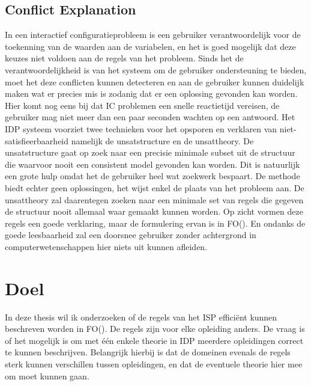 \subsection{Conflict Explanation}
In een interactief configuratieprobleem is een gebruiker verantwoordelijk voor de toekenning van de waarden aan de variabelen, en het is goed mogelijk dat deze keuzes niet voldoen aan de regels van het probleem. Sinds het de verantwoordelijkheid is van het systeem om de gebruiker ondersteuning te bieden, moet het deze conflicten kunnen detecteren en aan de gebruiker kunnen duidelijk maken wat er precies mis is zodanig dat er een oplossing gevonden kan worden. Hier komt nog eens bij dat IC problemen een snelle reactietijd vereisen, de gebruiker mag niet meer dan een paar seconden wachten op een antwoord. Het IDP systeem voorziet twee technieken voor het opsporen en verklaren van niet-satisfieerbaarheid namelijk de unsatstructure en de unsattheory. De unsatstructure gaat op zoek naar een precisie minimale subset uit de structuur die waarvoor nooit een consistent model gevonden kan worden. Dit is natuurlijk een grote hulp omdat het de gebruiker heel wat zoekwerk bespaart. De methode biedt echter geen oplossingen, het wijst enkel de plaats van het probleem aan. De unsattheory zal daarentegen zoeken naar een minimale set van regels die gegeven de structuur nooit allemaal waar gemaakt kunnen worden. Op zicht vormen deze regels een goede verklaring, maar de formulering ervan is in FO(\textperiodcentered). En ondanks de goede leesbaarheid zal een doorsnee gebruiker zonder achtergrond in computerwetenschappen hier niets uit kunnen afleiden.


\section{Doel}
In deze thesis wil ik onderzoeken of de regels van het ISP effici\"{e}nt kunnen beschreven worden in FO(\textperiodcentered). De regels zijn voor elke opleiding anders. De vraag is of het mogelijk is om met \'{e}\'{e}n enkele theorie in IDP meerdere opleidingen correct te kunnen beschrijven. Belangrijk hierbij is dat de domeinen evenals de regels sterk kunnen verschillen tussen opleidingen, en dat de eventuele theorie hier mee om moet kunnen gaan. 

